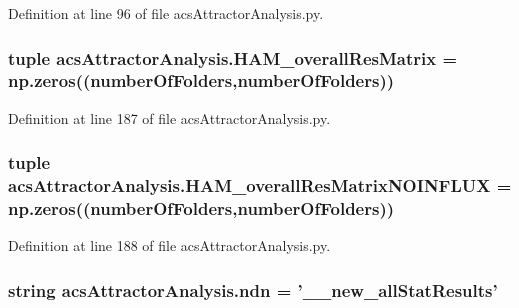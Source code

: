 Definition at line 96 of file acs\+Attractor\+Analysis.\+py.

\hypertarget{a00124_a46dc8cdfb545b64952370e51ff02336f}{
\subsubsection[{H\+A\+M\+\_\+overall\+Res\+Matrix}]{\setlength{\rightskip}{0pt plus 5cm}tuple acs\+Attractor\+Analysis.\+H\+A\+M\+\_\+overall\+Res\+Matrix = np.\+zeros(({\bf number\+Of\+Folders},{\bf number\+Of\+Folders}))}}\label{a00124_a46dc8cdfb545b64952370e51ff02336f}


Definition at line 187 of file acs\+Attractor\+Analysis.\+py.

\hypertarget{a00124_a9aa1adb46370d97e4f38e7f09eb7a97c}{
\subsubsection[{H\+A\+M\+\_\+overall\+Res\+Matrix\+N\+O\+I\+N\+F\+L\+U\+X}]{\setlength{\rightskip}{0pt plus 5cm}tuple acs\+Attractor\+Analysis.\+H\+A\+M\+\_\+overall\+Res\+Matrix\+N\+O\+I\+N\+F\+L\+U\+X = np.\+zeros(({\bf number\+Of\+Folders},{\bf number\+Of\+Folders}))}}\label{a00124_a9aa1adb46370d97e4f38e7f09eb7a97c}


Definition at line 188 of file acs\+Attractor\+Analysis.\+py.

\hypertarget{a00124_a109ce3a379d650b3f9b08debc0433a19}{
\subsubsection[{ndn}]{\setlength{\rightskip}{0pt plus 5cm}string acs\+Attractor\+Analysis.\+ndn = '\+\_\+\_\+new\+\_\+all\+Stat\+Results'}}\label{a00124_a109ce3a379d650b3f9b08debc0433a19}


